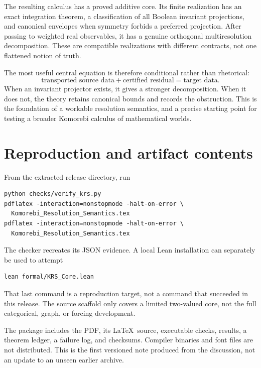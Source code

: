 \documentclass[11pt,letterpaper]{article}
\theoremstyle{definition}
\begin{document}
The resulting calculus has a proved additive core. Its finite realization has an exact integration theorem, a classification of all Boolean invariant projections, and canonical envelopes when symmetry forbids a preferred projection. After passing to weighted real observables, it has a genuine orthogonal multiresolution decomposition. These are compatible realizations with different contracts, not one flattened notion of truth.

The most useful central equation is therefore conditional rather than rhetorical:
\[
\boxed{\text{transported source data}+\text{certified residual}=\text{target data}.}
\]
When an invariant projector exists, it gives a stronger decomposition. When it does not, the theory retains canonical bounds and records the obstruction. This is the foundation of a workable resolution semantics, and a precise starting point for testing a broader Komorebi calculus of mathematical worlds.

\appendix
\section{Reproduction and artifact contents}
From the extracted release directory, run
\begin{verbatim}
python checks/verify_krs.py
pdflatex -interaction=nonstopmode -halt-on-error \
  Komorebi_Resolution_Semantics.tex
pdflatex -interaction=nonstopmode -halt-on-error \
  Komorebi_Resolution_Semantics.tex
\end{verbatim}
The checker recreates its JSON evidence. A local Lean installation can separately be used to attempt
\begin{verbatim}
lean formal/KRS_Core.lean
\end{verbatim}
That last command is a reproduction target, not a command that succeeded in this release. The source scaffold only covers a limited two-valued core, not the full categorical, graph, or forcing development.

The package includes the PDF, its \LaTeX\ source, executable checks, results, a theorem ledger, a failure log, and checksums. Compiler binaries and font files are not distributed. This is the first versioned note produced from the discussion, not an update to an unseen earlier archive.
\end{document}
